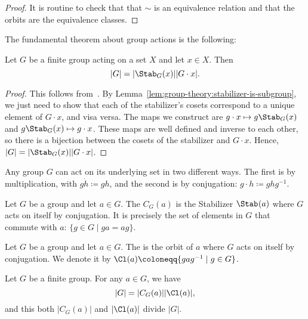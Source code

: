 \documentclass[12pt]{report}
\begin{document}
\begin{proof}
  It is routine to check that that \(\sim\) is an equivalence relation and that the orbits are the equivalence classes.
\end{proof}

The fundamental theorem about group actions is the following:

\begin{theorem}\label{thm:group-theory:orbit-stabilizer}
  Let \(G\) be a finite group acting on a set \(X\) and let \(x \in X\). Then
  \[|G| = |\Stab_{G}(x)| |G \cdot x|.\]
\end{theorem}

\begin{proof}
  This follows from~. By Lemma~\ref{lem:group-theory:stabilizer-is-subgroup}, we just need to show that each of the stabilizer's cosets correspond to a unique element of \(G \cdot x\), and visa versa. The maps we construct are \(g \cdot x \mapsto g\Stab_{G}(x)\) and \(g\Stab_{G}(x) \mapsto g\cdot x\). These maps are well defined and inverse to each other, so there is a bijection between the cosets of the stabilizer and \(G \cdot x\). Hence, \(|G| = |\Stab_{G}(x)| |G \cdot x|\).
\end{proof}

\begin{example}
  Any group \(G\) can act on its underlying set in two different ways. The first is by multiplication, with \(g \dot h \coloneqq gh\), and the second is by conjugation: \(g \cdot h \coloneqq ghg^{-1}\).
\end{example}

\begin{definition}\label{def:group-theory:centralizer}
  Let \(G\) be a group and let \(a \in G\). The  \(C_{G}(a)\) is the Stabilizer \(\Stab_{}(a)\) where \(G\) acts on itself by conjugation. It is precisely the set of elements in \(G\) that commute with \(a\): \(\{g \in G \mid ga = ag\}\).
\end{definition}

\begin{definition}\label{def:group-theory:conjugacy-class}
  Let \(G\) be a group and let \(a \in G\). The  is the orbit of \(a\) where \(G\) acts on itself by conjugation. We denote it by \(\Cl(a) \coloneqq \{gag^{-1} \mid g \in G\}\).
\end{definition}

\begin{corollary}\label{cor:group-theory:centralizer-conjugacy-classes-divide-G}
  Let \(G\) be a finite group. For any \(a \in G\), we have
  \[|G| = |C_{G}(a)| |\Cl(a)|,\]
  and this both \(|C_{G}(a)|\) and \(|\Cl(a)|\) divide \(|G|\).
\end{corollary}
\end{document}

